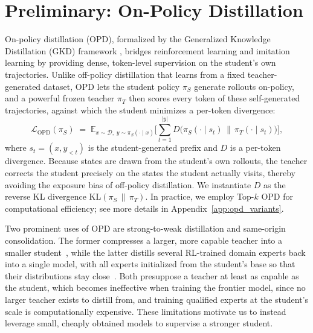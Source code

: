 \documentclass{article}
\begin{document}
\section{Preliminary: On-Policy Distillation}
\label{sec:preliminary}
On-policy distillation (OPD), formalized by the Generalized Knowledge Distillation (GKD) framework \citep{agarwal2024policy}, bridges reinforcement learning and imitation learning by providing dense, token-level supervision on the student's own trajectories. Unlike off-policy distillation that learns from a fixed teacher-generated dataset, OPD lets the student policy $\pi_{S}$ generate rollouts on-policy, and a powerful frozen teacher $\pi_{T}$ then scores every token of these self-generated trajectories, against which the student minimizes a per-token divergence:
\begin{equation}
\label{eq:opd}
\mathcal{L}_{\mathrm{OPD}}(\pi_{S}) \;=\; \mathbb{E}_{x \sim \mathcal{D},\; y \sim \pi_{S}(\cdot \mid x)} \bigg[ \sum_{t=1}^{|y|} D\big( \pi_{S}(\cdot \mid s_t) \,\big\|\, \pi_{T}(\cdot \mid s_t) \big) \bigg],
\end{equation}
where $s_t = (x, y_{<t})$ is the student-generated prefix and $D$ is a per-token divergence. Because states are drawn from the student's own rollouts, the teacher corrects the student precisely on the states the student actually visits, thereby avoiding the exposure bias of off-policy distillation. We instantiate $D$ as the reverse KL divergence $\mathrm{KL}(\pi_{S} \,\|\, \pi_{T})$. In practice, we employ Top-$k$ OPD for computational efficiency; see more details in Appendix~\ref{app:opd_variants}.

Two prominent uses of OPD are strong-to-weak distillation and same-origin consolidation. The former compresses a larger, more capable teacher into a smaller student~\citep{yang2025qwen3}, while the latter distills several RL-trained domain experts back into a single model, with all experts initialized from the student's base so that their distributions stay close~\citep{xiao2026mimo, ma2026mopd}. Both presuppose a teacher at least as capable as the student, which becomes ineffective when training the frontier model, since no larger teacher exists to distill from, and training qualified experts at the student's scale is computationally expensive. These limitations motivate us to instead leverage small, cheaply obtained models to supervise a stronger student.
\end{document}
